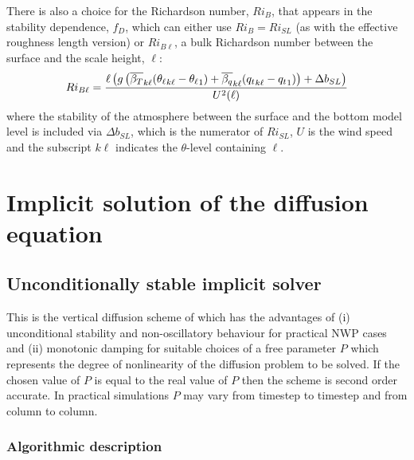 \documentclass{UMDP_article}
\begin{document}
There is also a choice for the Richardson number, $Ri_{B}$, that appears 
in the stability dependence, $f_D$, which can either use $Ri_{B}=Ri_{SL}$ 
(as with the effective roughness length version) or $Ri_{B \ell}$, a bulk 
Richardson number between the surface and the scale height, $\ell$:
\begin{equation*}
  Ri_{B \ell} = \frac{ \ell \left( g \left( 
     \overline{\beta_T}_{k\ell} ({\theta_{\ell}}_{k\ell}-{\theta_{\ell}}_{1})
   + \overline{\beta_q}_{k\ell} ({q_t}_{k\ell}-{q_t}_{1}) \right)
                                      + \Delta b_{SL} \right) }{U^2(\ell)}
\end{equation*}
where the stability of the atmosphere between the surface and the bottom 
model level is included via $\Delta b_{SL}$, which is the numerator of 
$Ri_{SL}$, $U$ is the wind speed and the subscript $k \ell$ indicates 
the $\theta$-level containing $\ell$.

\section{Implicit solution of the diffusion equation}
\label{sec:implicit}

\subsection{Unconditionally stable implicit solver}

This is the vertical diffusion scheme of \cite{woodetal2007} which has
the advantages of (i) unconditional stability and non-oscillatory
behaviour for practical NWP cases and (ii) monotonic damping for
suitable choices of a free parameter $P$ which represents the degree
of nonlinearity of the diffusion problem to be solved. If the chosen
value of $P$ is equal to the real value of $P$ then the scheme is
second order accurate.  In practical simulations $P$ may vary from
timestep to timestep and from column to column.

\subsubsection{Algorithmic description}
\end{document}
